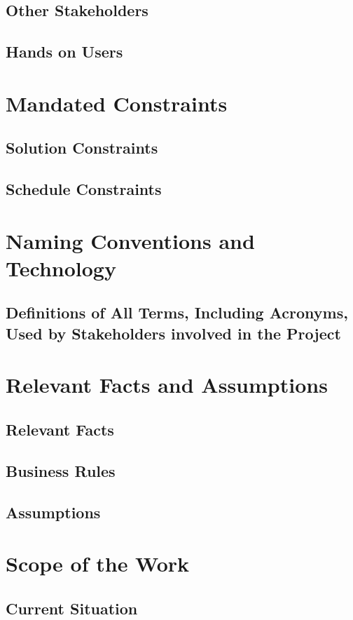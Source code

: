 \documentclass[paper=letter, fontsize=10pt]{scrartcl}
\numberwithin{equation}{section}		%
\numberwithin{figure}{section}			%
\numberwithin{table}{section}				%
\begin{document}
\subsection{Other Stakeholders}
\subsection{Hands on Users}

\section{Mandated Constraints}
\subsection{Solution Constraints}
\subsection{Schedule Constraints}

\section{Naming Conventions and Technology}
\subsection{Definitions of All Terms, Including Acronyms, Used by Stakeholders involved in the Project}

\section{Relevant Facts and Assumptions}
\subsection{Relevant Facts}
\subsection{Business Rules}
\subsection{Assumptions}

\section{Scope of the Work}
\subsection{Current Situation}
\end{document}
